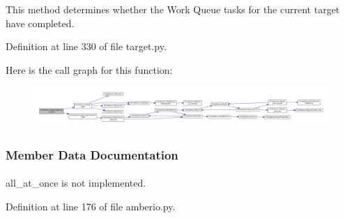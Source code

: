 \-This method determines whether the \-Work \-Queue tasks for the current target have completed. 



\-Definition at line 330 of file target.\-py.



\-Here is the call graph for this function\-:\nopagebreak
\begin{figure}[H]
\begin{center}
\leavevmode
\includegraphics[width=350pt]{classforcebalance_1_1target_1_1Target_af6099ec09486213869dba2491bd8ea04_cgraph}
\end{center}
\end{figure}




\subsubsection{\-Member \-Data \-Documentation}
\hypertarget{classforcebalance_1_1amberio_1_1AbInitio__AMBER_af08e6910f82424ed0b213b38b66be23f}{
\paragraph[{all\-\_\-at\-\_\-once}]{}}\label{classforcebalance_1_1amberio_1_1AbInitio__AMBER_af08e6910f82424ed0b213b38b66be23f}


all\-\_\-at\-\_\-once is not implemented. 



\-Definition at line 176 of file amberio.\-py.

\hypertarget{classforcebalance_1_1abinitio_1_1AbInitio_a3eceb701813ccb83d11a0dc71df835b7}{
\paragraph[{\-Atom\-Lists}]{}}\label{classforcebalance_1_1abinitio_1_1AbInitio_a3eceb701813ccb83d11a0dc71df835b7}


